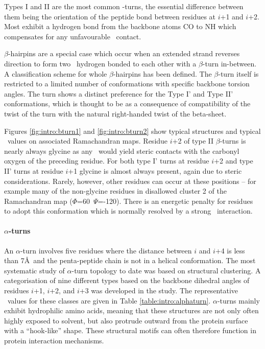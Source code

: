 Types I and II are the most common \be-turns, the essential difference between them being the orientation of the peptide bond between residues at $i$+1 and $i$+2. Most exhibit a hydrogen bond from the backbone atoms CO to NH which compensates for any unfavourable \vdw\ contact.

$\beta$-hairpins are a special case which occur when an extended strand reverses direction to
form two \bstrands\ hydrogen bonded to each other with a $\beta$-turn in-between.
A classification scheme for whole $\beta$-hairpins has been defined\cite{STRUCTURE:Mil86}.
The $\beta$-turn itself is restricted to a limited number of conformations\cite{STRUCTURE:Sib85,STRUCTURE:Sib89} with specific backbone torsion angles. The turn shows a distinct preference for the Type I' and Type II' conformations, which is thought to be as a consequence of compatibility of the twist of the turn with the natural right-handed twist of the beta-sheet\cite{STRUCTURE:Sib89}.

Figures \ref{fig:intro:bturn1} and \ref{fig:intro:bturn2} show typical structures
and typical \phipsi\ values on associated Ramachandran maps. Residue $i$+2
of type II $\beta$-turns is nearly always glycine as any \sidechain\
would yield steric contacts with the carbonyl oxygen of the preceding residue.
For both type I' turns at residue $i$+2 and type II' turns at residue $i$+1 glycine is almost always present, again due to steric considerations. Rarely, however, other residues can occur at these positions -- for example many of the non-glycine residues in disallowed cluster 2 of the Ramachandran map ($\Phi$=60\degree\ $\Psi$=-120\degree).  There is an energetic penalty for residues to adopt this conformation which is normally resolved by a strong \sidechain\ interaction.

\paragraph{$\alpha$-turns} \isep 
An $\alpha$-turn involves five residues where the distance between \ca$i$ and \ca$i$+4 is less than 7\AA\ and the penta-peptide chain is not in a helical conformation. The most systematic study\cite{STRUCTURE:Pav96} of $\alpha$-turn topology to date was based on structural clustering. A categorisation of nine different types based on the backbone dihedral angles of residues $i$+1, $i$+2, and $i$+3 was developed in the study. The representative \phipsi\ values for these classes are given in Table \ref{table:intro:alphaturn}. $\alpha$-turns mainly exhibit hydrophilic amino acids, meaning that these structures are not only often highly exposed to solvent, but also protrude outward from the protein surface with a ``hook-like'' shape. These structural motifs can often therefore function in protein interaction mechanisms\cite{STRUCTURE:Art81,STRUCTURE:Sto89,STRUCTURE:Wan90}.

